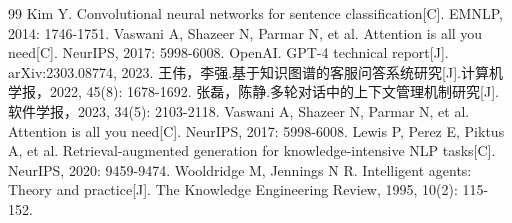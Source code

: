 \documentclass{harryopo-report}
\begin{document}
\begin{thebibliography}{99}
 Kim Y. Convolutional neural networks for sentence classification[C]. EMNLP, 2014: 1746-1751.
 Vaswani A, Shazeer N, Parmar N, et al. Attention is all you need[C]. NeurIPS, 2017: 5998-6008.
 OpenAI. GPT-4 technical report[J]. arXiv:2303.08774, 2023.
 王伟，李强.基于知识图谱的客服问答系统研究[J].计算机学报，2022, 45(8): 1678-1692.
 张磊，陈静.多轮对话中的上下文管理机制研究[J].软件学报，2023, 34(5): 2103-2118.
 Vaswani A, Shazeer N, Parmar N, et al. Attention is all you need[C]. NeurIPS, 2017: 5998-6008.
 Lewis P, Perez E, Piktus A, et al. Retrieval-augmented generation for knowledge-intensive NLP tasks[C]. NeurIPS, 2020: 9459-9474.
 Wooldridge M, Jennings N R. Intelligent agents: Theory and practice[J]. The Knowledge Engineering Review, 1995, 10(2): 115-152.
\end{thebibliography}
\end{document}
